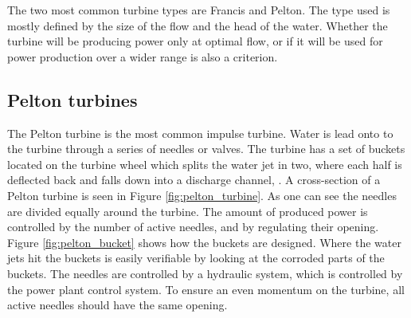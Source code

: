     
    The two most common turbine types are Francis and Pelton. The type used is mostly defined by the size of the flow and the head of the water. Whether the turbine will be producing power only at optimal flow, or if it will be used for power production over a wider range is also a criterion. 
    
    
    
    \subsection{Pelton turbines}\label{subsec:pelton}
        
        The Pelton turbine is the most common impulse turbine. Water is lead onto to the turbine through a series of needles or valves. The turbine has a set of buckets located on the turbine wheel which splits the water jet in two, where each half is deflected back and falls down into a discharge channel, \cite{Paish2002}. A cross-section of a Pelton turbine is seen in Figure \ref{fig:pelton_turbine}. As one can see the needles are divided equally around the turbine. The amount of produced power is controlled by the number of active needles, and by regulating their opening. Figure \ref{fig:pelton_bucket} shows how the buckets are designed. Where the water jets hit the buckets is easily verifiable by looking at the corroded parts of the buckets. The needles are controlled by a hydraulic system, which is controlled by the power plant control system. To ensure an even momentum on the turbine, all active needles should have the same opening. 
        
